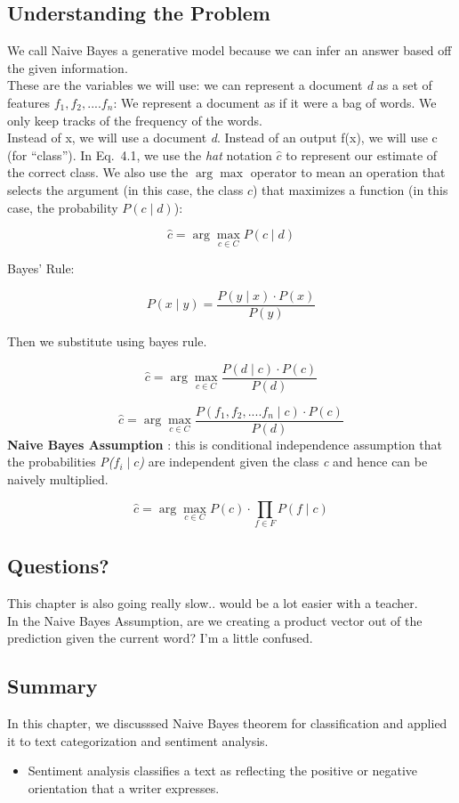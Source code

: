 \documentclass{article}
\begin{document}
\subsection{Understanding the Problem}
We call Naive Bayes a generative model because we can infer an answer based off the given information.
\\These are the variables we will use: we can represent a document \textit{d} as a set of features $f_1, f_2,.... f_n$:
We represent a document as if it were a bag of words. We only keep tracks of the frequency of the words.
\\Instead of x, we will use a document \textit{d}. Instead of an output f(x), we will use c (for “class”).
In Eq.~4.1, we use the \emph{hat} notation $\hat{c}$ to represent our estimate of the correct class.
We also use the $\arg\max$ operator to mean an operation that selects the argument (in this case, the class $c$)
that maximizes a function (in this case, the probability $P(c \mid d)$):

\[
    \hat{c} = \arg\max_{c \in C} P(c \mid d)
\]

Bayes' Rule:

\[
    P(x \mid y) = \frac{P(y \mid x) \cdot P(x)}{P(y)}
\]

Then we substitute using bayes rule.

\[
    \hat{c} = \arg\max_{c \in C} \frac{P(d \mid c) \cdot P(c)}{P(d)}
\]



\[
    \hat{c} = \arg\max_{c \in C} \frac{P(f_1, f_2,....f_n\mid c) \cdot P(c)}{P(d)}
\]
\textbf{Naive Bayes Assumption} : this is conditional independence assumption that the probabilities \textit{P($f_i \mid c$)}
are independent given the class \textit{c} and hence can be naively multiplied.

\[
    \hat{c} = \arg\max_{c \in C} P(c) \cdot \prod_{f \in F} P(f \mid c)
\]

\subsection{Questions?}
This chapter is also going really slow.. would be a lot easier with a teacher.
\\ In the Naive Bayes Assumption, are we creating a product vector out of the prediction given the current word? I'm a little confused.

\subsection{Summary}
In this chapter, we discusssed Naive Bayes theorem for classification and applied it to text categorization and sentiment analysis.
\begin{itemize}
    \item Sentiment analysis classifies a text as reflecting the positive or negative orientation that a writer expresses.
\end{itemize}
\end{document}
